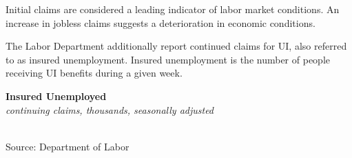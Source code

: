 \documentclass{report}
\newcommand{\tbllink}[1]{\href{https://raw.githubusercontent.com/bdecon/US-chartbook/master/chartbook/data/#1}{\faTable}}
\newcommand{\shticks}{
		date coordinates in=x, axis line style={draw=none},
		xmax={2023-11-01},
		}
\newcommand{\bbar}[2]{extra #1 ticks = {{#2}}, extra #1 tick labels = ,
		extra #1 tick style = {grid=major, grid style={thick, black!25}},}
\newcommand{\stdline}[4]{\addplot[very thick, no markers, color=#1] 
		table [x=#2, y=#3, col sep=comma] {#4};	}
\begin{document}
{\begin{minipage}{0.3\textwidth}
Initial claims are considered a leading indicator of labor market conditions. An increase in jobless claims suggests a deterioration in economic conditions. 
\end{minipage}
\vspace{1mm}

\begin{minipage}{0.76\textwidth}
\small The Labor Department additionally report continued claims for UI, also referred to as insured unemployment. Insured unemployment is the number of people receiving UI benefits during a given week. 
\end{minipage}
\vspace{0.5mm}

\begin{minipage}{0.42\textwidth}
\normalsize \textbf{Insured Unemployed}\\
\footnotesize{\textit{continuing claims, thousands, seasonally adjusted}}
\vspace*{-2mm}

\hspace*{-2mm} \\
\footnotesize{Source: Department of Labor} \hfill \tbllink{ccsa.csv} \hspace{1mm}
\end{minipage} \hspace{4mm} \begin{minipage}{0.3\textwidth}
\small 


\end{minipage}
\vspace{5mm}

}
\end{document}
